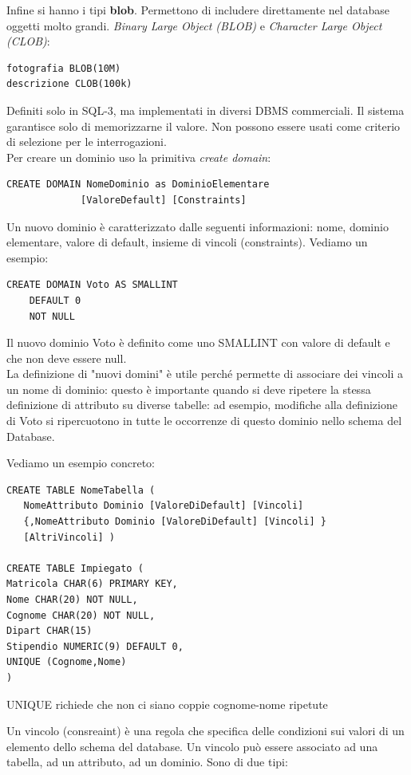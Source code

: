 \documentclass[a4paper,12pt, oneside]{book}
\begin{document}
Infine si hanno i tipi \textbf{blob}. Permettono di includere direttamente nel database oggetti molto grandi.
\textit{Binary Large Object (BLOB)} e \textit{Character Large Object (CLOB)}:
\begin{verbatim}
fotografia BLOB(10M)
descrizione CLOB(100k)
\end{verbatim}
Definiti solo in SQL-3, ma implementati in diversi DBMS
commerciali. Il sistema garantisce solo di memorizzarne il
valore. Non possono essere usati come criterio di selezione
per le interrogazioni.\\
Per creare un dominio uso la primitiva \textit{create domain}:
\begin{verbatim}
CREATE DOMAIN NomeDominio as DominioElementare
             [ValoreDefault] [Constraints]
\end{verbatim}
Un nuovo dominio è caratterizzato dalle seguenti informazioni:
nome, dominio elementare, valore di default, insieme di vincoli (constraints). Vediamo un esempio:
\begin{verbatim}
CREATE DOMAIN Voto AS SMALLINT
    DEFAULT 0
    NOT NULL
\end{verbatim}
Il nuovo dominio Voto è definito come uno SMALLINT con
valore di default e che non deve essere null.\\
La definizione di "nuovi domini" è utile perché permette di
associare dei vincoli a un nome di dominio: questo è
importante quando si deve ripetere la stessa definizione di
attributo su diverse tabelle: ad esempio, modifiche alla
definizione di Voto si ripercuotono in tutte le occorrenze di
questo dominio nello schema del Database.
\begin{esempio}
Vediamo un esempio concreto:
\begin{verbatim}
CREATE TABLE NomeTabella (
   NomeAttributo Dominio [ValoreDiDefault] [Vincoli]
   {,NomeAttributo Dominio [ValoreDiDefault] [Vincoli] }
   [AltriVincoli] )

CREATE TABLE Impiegato (
Matricola CHAR(6) PRIMARY KEY,
Nome CHAR(20) NOT NULL,
Cognome CHAR(20) NOT NULL,
Dipart CHAR(15)
Stipendio NUMERIC(9) DEFAULT 0,
UNIQUE (Cognome,Nome)
)
\end{verbatim}
UNIQUE richiede che non ci siano coppie cognome-nome ripetute
\end{esempio}
Un vincolo (consreaint) è una regola che specifica delle condizioni
sui valori di un elemento dello schema del database.
Un vincolo può essere associato ad una tabella, ad
un attributo, ad un dominio. Sono di due tipi:
\end{document}
